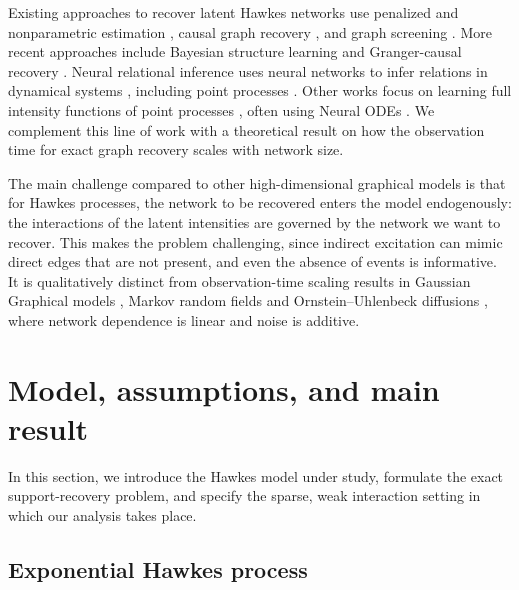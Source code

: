 \documentclass{article}
\begin{document}
Existing approaches to recover latent Hawkes networks use penalized \cite{hansen2015lasso, bacry2020sparse, cai2024latent} and nonparametric estimation \cite{bacry2016first, donnet2020hawkes}, causal graph recovery \cite{achab2018uncovering}, and graph screening \cite{chen2017nearly}.
More recent approaches include Bayesian structure learning \cite{linderman2014discovering, rasmussen2013bayesian, malem2022variational} and Granger-causal recovery \cite{xu2016learning, wu2024learning}. 
Neural relational inference uses neural networks to infer relations in dynamical systems \cite{kipf2018neural, pan2024graph, wu2025riva}, including point processes \cite{zhang2021neural}.
Other works focus on learning full intensity functions of point processes \cite{omi2019fully, ludke2023add}, often using Neural ODEs \cite{jia2019neural, zhang2024neural}. We complement this line of work with a theoretical result on how the observation time for exact graph recovery scales with network size.

The main challenge compared to other high-dimensional graphical models \cite{meinshausen2006high} is that for Hawkes processes, the network to be recovered enters the model endogenously: the interactions of the latent intensities are governed by the network we want to recover. This makes the problem challenging, since indirect excitation can mimic direct edges that are not present, and even the absence of events is informative.
It is qualitatively distinct from observation-time scaling results in Gaussian Graphical models \cite{wainwright2009information, wainwright2009sharp}, Markov random fields \cite{ravikumar2010high} and Ornstein--Uhlenbeck diffusions \cite{bento2010learning, bento2011information}, where network dependence is linear and noise is additive.

\section{Model, assumptions, and main result}\label{sec:setting}
In this section, we introduce the Hawkes model under study, formulate the exact support-recovery problem, and specify the sparse, weak interaction setting in which our analysis takes place.

\subsection{Exponential Hawkes process}
\end{document}
